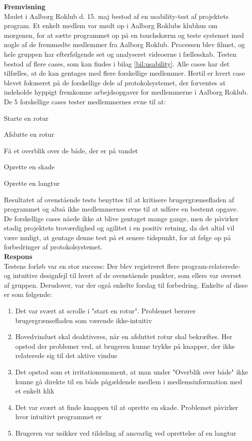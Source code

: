 \textbf{Fremvisning}\\
Mødet i Aalborg Roklub d. 15. maj bestod af en usability-test af projektets program. Et enkelt medlem var mødt op i Aalborg Roklubs klubhus om morgenen, for at sætte programmet op på en touchskærm og teste systemet med nogle af de fremmødte medlemmer fra Aalborg Roklub. Processen blev filmet, og hele gruppen har efterfølgende set og analyseret videoerne i fællesskab. Testen bestod af flere cases, som kan findes i bilag \ref{bil:usability}. Alle cases har det tilfælles, at de kan gentages med flere forskellige medlemmer. Hertil er hvert case blevet fokuseret på de forskellige dele af protokolsystemet, der forventes at indeholde hyppigt fremkomne arbejdsopgaver for medlemmerne i Aalborg Roklub.\\

De 5 forskellige cases tester medlemmernes evne til at:
\begin{enumerate_small}
    \item Starte en rotur
    \item Afslutte en rotur
    \item Få et overblik over de både, der er på vandet
    \item Oprette en skade
    \item Oprette en langtur
\end{enumerate_small}

Resultatet af ovenstående tests benyttes til at kritisere brugergrænsefladen af programmet og altså ikke medlemmernes evne til at udføre en bestemt opgave. De forskellige cases nåede ikke at blive gentaget mange gange, men de påvirker stadig projektets troværdighed og agilitet i en positiv retning, da det altid vil være muligt, at gentage denne test på et senere tidspunkt, for at følge op på forbedringer af protokolsystemet.\\

\textbf{Respons}\\
Testens forløb var en stor success: Der blev registreret flere program-relaterede- og intuitive designfejl til hvert af de ovenstående punkter, som ellers var overset af gruppen. Derudover, var der også enkelte forslag til forbedring. Enkelte af disse er som følgende:\\

\begin{enumerate}
    \item Det var svært at scrolle i "start en rotur". Problemet berører brugergrænsefladen som værende ikke-intuitiv
    \item Hovedvinduet skal deaktiveres, når en afsluttet rotur skal bekræftes. Her opstod der problemer ved, at brugeren kunne trykke på knapper, der ikke relaterede sig til det aktive vindue
    \item Det opstod som et irritationsmoment, at man under "Overblik over både" ikke kunne gå direkte til en båds pågældende medlem i medlemsinformation med et enkelt klik
    \item Det var svært at finde knappen til at oprette en skade. Problemet påvirker hvor intuitivt programmet er
    \item Brugeren var usikker ved tildeling af ansvarlig ved oprettelse af en langtur
\end{enumerate}

